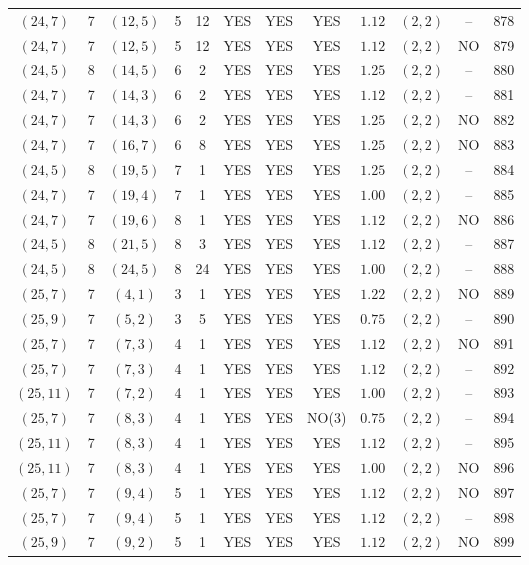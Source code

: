 \begin{longtable}{|c|c|c|c|c|c|c|c|c|c|c|c|}
$(24,7)$ & 7 & $(12,5)$ & 5 & 12 & YES & YES & YES & $1.12$ & $(2,2)$ & -- & 878\\
$(24,7)$ & 7 & $(12,5)$ & 5 & 12 & YES & YES & YES & $1.12$ & $(2,2)$ & NO & 879\\
$(24,5)$ & 8 & $(14,5)$ & 6 & 2 & YES & YES & YES & $1.25$ & $(2,2)$ & -- & 880\\
$(24,7)$ & 7 & $(14,3)$ & 6 & 2 & YES & YES & YES & $1.12$ & $(2,2)$ & -- & 881\\
$(24,7)$ & 7 & $(14,3)$ & 6 & 2 & YES & YES & YES & $1.25$ & $(2,2)$ & NO & 882\\
$(24,7)$ & 7 & $(16,7)$ & 6 & 8 & YES & YES & YES & $1.25$ & $(2,2)$ & NO & 883\\
$(24,5)$ & 8 & $(19,5)$ & 7 & 1 & YES & YES & YES & $1.25$ & $(2,2)$ & -- & 884\\
$(24,7)$ & 7 & $(19,4)$ & 7 & 1 & YES & YES & YES & $1.00$ & $(2,2)$ & -- & 885\\
$(24,7)$ & 7 & $(19,6)$ & 8 & 1 & YES & YES & YES & $1.12$ & $(2,2)$ & NO & 886\\
$(24,5)$ & 8 & $(21,5)$ & 8 & 3 & YES & YES & YES & $1.12$ & $(2,2)$ & -- & 887\\
$(24,5)$ & 8 & $(24,5)$ & 8 & 24 & YES & YES & YES & $1.00$ & $(2,2)$ & -- & 888\\
$(25,7)$ & 7 & $(4,1)$ & 3 & 1 & YES & YES & YES & $1.22$ & $(2,2)$ & NO & 889\\
$(25,9)$ & 7 & $(5,2)$ & 3 & 5 & YES & YES & YES & $0.75$ & $(2,2)$ & -- & 890\\
$(25,7)$ & 7 & $(7,3)$ & 4 & 1 & YES & YES & YES & $1.12$ & $(2,2)$ & NO & 891\\
$(25,7)$ & 7 & $(7,3)$ & 4 & 1 & YES & YES & YES & $1.12$ & $(2,2)$ & -- & 892\\
$(25,11)$ & 7 & $(7,2)$ & 4 & 1 & YES & YES & YES & $1.00$ & $(2,2)$ & -- & 893\\
$(25,7)$ & 7 & $(8,3)$ & 4 & 1 & YES & YES & NO(3) & $0.75$ & $(2,2)$ & -- & 894\\
$(25,11)$ & 7 & $(8,3)$ & 4 & 1 & YES & YES & YES & $1.12$ & $(2,2)$ & -- & 895\\
$(25,11)$ & 7 & $(8,3)$ & 4 & 1 & YES & YES & YES & $1.00$ & $(2,2)$ & NO & 896\\
$(25,7)$ & 7 & $(9,4)$ & 5 & 1 & YES & YES & YES & $1.12$ & $(2,2)$ & NO & 897\\
$(25,7)$ & 7 & $(9,4)$ & 5 & 1 & YES & YES & YES & $1.12$ & $(2,2)$ & -- & 898\\
$(25,9)$ & 7 & $(9,2)$ & 5 & 1 & YES & YES & YES & $1.12$ & $(2,2)$ & NO & 899\\

\end{longtable}
